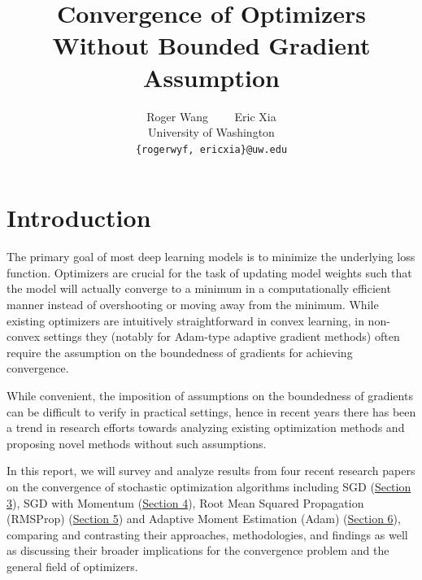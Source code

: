 \documentclass{article}
\title{Convergence of Optimizers Without Bounded Gradient Assumption}
\author{%
  Roger Wang \ \ \ \  Eric Xia \\
  University of Washington\\
  \texttt{\{rogerwyf, ericxia\}@uw.edu} 
}
\begin{document}
\maketitle


\section{Introduction}

The primary goal of most deep learning models is to minimize the underlying loss function.
Optimizers are crucial for the task of updating model weights such that the model will actually converge to a minimum in a computationally efficient manner instead of overshooting or moving away from the minimum. While existing optimizers are intuitively straightforward in convex learning, in non-convex settings they (notably for Adam-type adaptive gradient methods)
often require the assumption on the boundedness of gradients for achieving convergence.

While convenient, the imposition of assumptions on the boundedness of gradients can be difficult to verify in practical settings, hence in recent years there has been a trend in research efforts towards analyzing existing optimization methods and proposing novel methods without such assumptions. 

In this report, we will survey and analyze results from four recent research papers on the convergence of stochastic optimization algorithms including SGD (\hyperref[section3]{Section 3}), SGD with Momentum (\hyperref[section4]{Section 4}), Root Mean Squared Propagation (RMSProp) (\hyperref[section6]{Section 5}) and Adaptive Moment Estimation (Adam) (\hyperref[section7]{Section 6}), comparing and contrasting their approaches, methodologies, and findings as well as discussing their broader implications for the convergence problem and the general field of optimizers.
\end{document}
